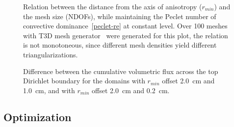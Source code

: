 \documentclass[review,times,3p,10pt]{elsarticle}
\begin{document}
 \begin{figure}
\centering
{}
 \caption{Relation between the distance from the axis of anisotropy ($r_{min}$) and the mesh size (NDOFs), while maintaining the Peclet number of convective dominance~\eqref{peclet-re} at constant level. Over 100 meshes with T3D mesh generator~\citep{t3d} were generated for this plot, the relation is not monotoneous, since different mesh densities yield different triangularizations.}
 \label{mesh-dens}
\end{figure}


 \begin{figure}
\centering
{}
 \caption{Difference between the cumulative volumetric flux across  the top Dirichlet boundary for the domains with $r_{min}$ offset 2.0~cm and 1.0~cm, and with $r_{min}$ offset 2.0~cm and 0.2~cm.}
 \label{mesh-evals2}
\end{figure}



\subsection{Optimization}
\end{document}
